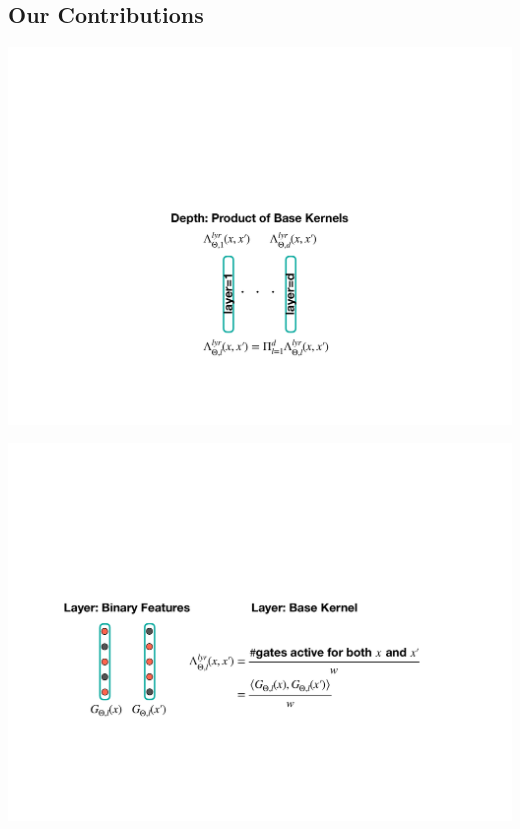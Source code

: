 \documentclass{article}
\begin{document}
\subsection{Our Contributions}



\begin{center}
\includegraphics[scale=0.3]{figs/step4.pdf}
\end{center}

\begin{center}
\includegraphics[scale=0.3]{figs/step3.pdf}
\end{center}
\end{document}
